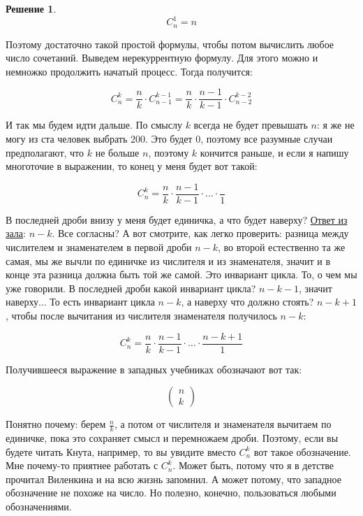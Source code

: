 \documentclass[russian]{lecture-notes}
\theoremstyle{definition}
\newtheorem*{solution}{Решение}
\begin{document}
\begin{enumerate}
\begin{solution}
			 \[
			 	C_n^1 = n
			 \] 
			 
			 Поэтому достаточно такой простой формулы, чтобы потом вычислить любое число сочетаний. Выведем нерекуррентную формулу. Для этого можно и немножко продолжить начатый процесс. Тогда получится:
			 
			 \[
			 	C_n^k = \frac{n}{k} \cdot C_{n-1}^{k-1} = \frac{n}{k} \cdot \frac{n-1}{k-1} \cdot C_{n-2}^{k-2}
			 \]
			 
			 И так мы будем идти дальше. По смыслу $k$ всегда не будет превышать $n$: я же не могу из ста человек выбрать 200. Это будет 0, поэтому все разумные случаи предполагают, что $k$ не больше $n$, поэтому $k$ кончится раньше, и если я напишу многоточие в выражении, то конец у меня будет вот такой:
			 
			 \[
			 	C_n^k = \frac{n}{k} \cdot \frac{n-1}{k-1} \cdot \ldots \cdot \frac{}{1}
			 \]
			 
			 В последней дроби внизу у меня будет единичка, а что будет наверху? \underline{Ответ из зала}: $n-k$. Все согласны? А вот смотрите, как легко проверить: разница между числителем и знаменателем в первой дроби $n - k$, во второй естественно та же самая, мы же вычли по единичке из числителя и из знаменателя, значит и в конце эта разница должна быть той же самой.  Это инвариант цикла. То, о чем мы уже говорили. В последней дроби какой инвариант цикла? $n - k - 1$, значит наверху... То есть инвариант цикла $n - k$, а наверху что должно стоять? $n - k + 1$, чтобы после вычитания из числителя знаменателя получилось $n - k$:
			 
			 \[
			 	C_n^k = \frac{n}{k} \cdot \frac{n-1}{k-1} \cdot \ldots \cdot \frac{n - k + 1}{1}
			 \]
			 
			 Получившееся выражение в западных учебниках обозначают вот так:
			 
			 \[
			 	\left(
			 	\begin{array}{c}
				 	n \\
				 	k
			 	\end{array}
			 	\right)
			 \]
			 
			 Понятно почему: берем $\frac{n}{k}$, а потом от числителя и знаменателя вычитаем по единичке, пока это сохраняет смысл и перемножаем дроби. Поэтому, если вы будете читать Кнута, например, то вы увидите вместо $C_n^k$ вот такое обозначение. Мне почему-то приятнее работать с $C_n^k$. Может быть, потому что я в детстве прочитал Виленкина и на всю жизнь запомнил. А может потому, что западное обозначение не похоже на число. Но полезно, конечно, пользоваться любыми обозначениями.
			 

\end{solution}
\end{enumerate}
\end{document}
